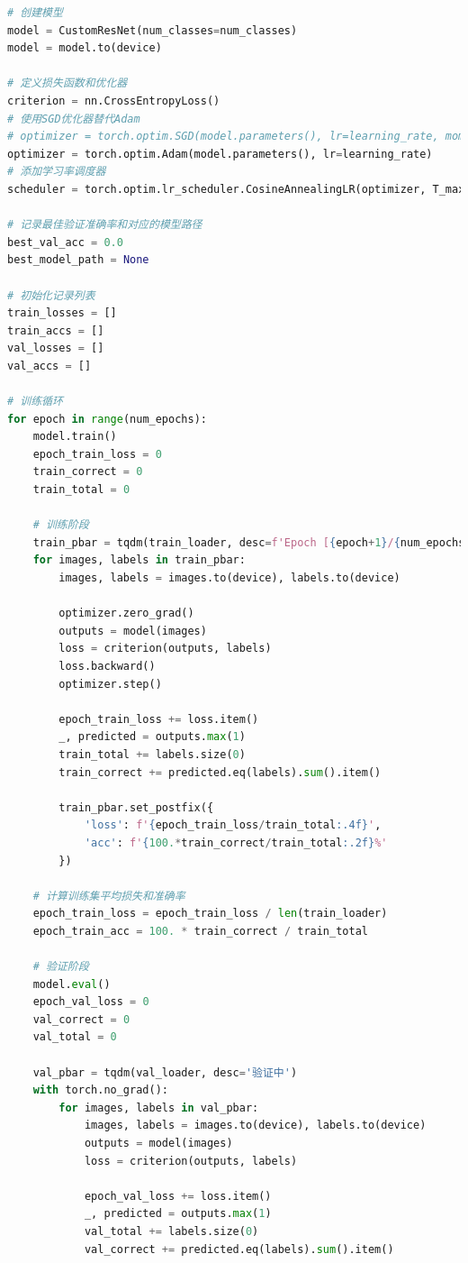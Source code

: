 \documentclass[12pt,a4paper,UTF8]{article}
\begin{document}
\begin{lstlisting}[language=Python, caption=训练代码]
# 创建模型
model = CustomResNet(num_classes=num_classes)
model = model.to(device)

# 定义损失函数和优化器
criterion = nn.CrossEntropyLoss()
# 使用SGD优化器替代Adam
# optimizer = torch.optim.SGD(model.parameters(), lr=learning_rate, momentum=0.9, weight_decay=5e-4)
optimizer = torch.optim.Adam(model.parameters(), lr=learning_rate)
# 添加学习率调度器
scheduler = torch.optim.lr_scheduler.CosineAnnealingLR(optimizer, T_max=num_epochs)

# 记录最佳验证准确率和对应的模型路径
best_val_acc = 0.0
best_model_path = None

# 初始化记录列表
train_losses = []
train_accs = []
val_losses = []
val_accs = []

# 训练循环
for epoch in range(num_epochs):
    model.train()
    epoch_train_loss = 0
    train_correct = 0
    train_total = 0
    
    # 训练阶段
    train_pbar = tqdm(train_loader, desc=f'Epoch [{epoch+1}/{num_epochs}] 训练')
    for images, labels in train_pbar:
        images, labels = images.to(device), labels.to(device)
        
        optimizer.zero_grad()
        outputs = model(images)
        loss = criterion(outputs, labels)
        loss.backward()
        optimizer.step()
        
        epoch_train_loss += loss.item()
        _, predicted = outputs.max(1)
        train_total += labels.size(0)
        train_correct += predicted.eq(labels).sum().item()
        
        train_pbar.set_postfix({
            'loss': f'{epoch_train_loss/train_total:.4f}',
            'acc': f'{100.*train_correct/train_total:.2f}%'
        })
    
    # 计算训练集平均损失和准确率
    epoch_train_loss = epoch_train_loss / len(train_loader)
    epoch_train_acc = 100. * train_correct / train_total
    
    # 验证阶段
    model.eval()
    epoch_val_loss = 0
    val_correct = 0
    val_total = 0
    
    val_pbar = tqdm(val_loader, desc='验证中')
    with torch.no_grad():
        for images, labels in val_pbar:
            images, labels = images.to(device), labels.to(device)
            outputs = model(images)
            loss = criterion(outputs, labels)
            
            epoch_val_loss += loss.item()
            _, predicted = outputs.max(1)
            val_total += labels.size(0)
            val_correct += predicted.eq(labels).sum().item()
            

\end{lstlisting}
\end{document}
